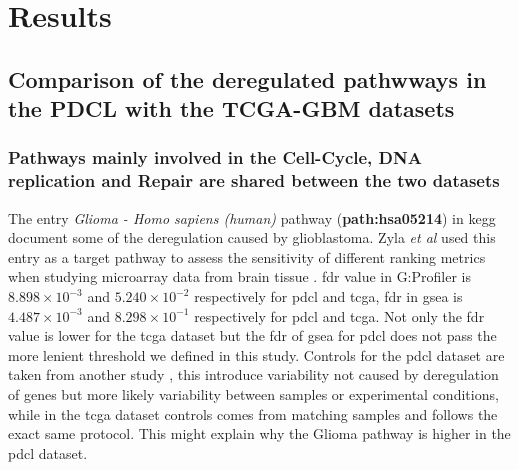 \section{Results}

\subsection{Comparison of the deregulated pathwways in the PDCL with the TCGA-GBM datasets}

\subsubsection{Pathways mainly involved in the Cell-Cycle, DNA replication and Repair are shared between the two datasets}

The entry \textit{Glioma - Homo sapiens (human)} pathway (\textbf{path:hsa05214}) in \acrshort{kegg} document some of the deregulation caused by glioblastoma.
Zyla \textit{et al} used this entry as a target pathway to assess the sensitivity of different ranking metrics when studying microarray data from brain tissue \cite*{Zyla2017}.
\acrshort{fdr} value in G:Profiler is $8.898 \times 10^{-3}$ and $5.240 \times 10^{-2}$ respectively for \acrshort{pdcl} and \acrshort{tcga}, \acrshort{fdr} in \acrshort{gsea} is $4.487 \times 10^{-3}$ and $8.298 \times 10^{-1}$ respectively for \acrshort{pdcl} and \acrshort{tcga}.
Not only the \acrshort{fdr} value is lower for the \acrshort{tcga} dataset but the \acrshort{fdr} of \acrshort{gsea} for \acrshort{pdcl} does not pass the more lenient threshold we defined in this study.
Controls for the \acrshort{pdcl} dataset are taken from another study \cite*{Lundin2018}, this introduce variability not caused by deregulation of genes but more likely variability between samples or experimental conditions, while in the \acrshort{tcga} dataset controls comes from matching samples and follows the exact same protocol.
This might explain why the Glioma pathway is higher in the \acrshort{pdcl} dataset.


